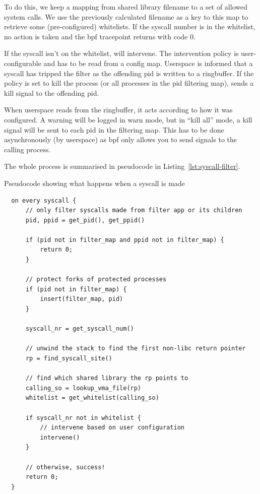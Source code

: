 To do this, we keep a mapping from shared library filename to a set of allowed
system calls. We use the previously calculated filename as a key to this map to
retrieve some (pre-configured) whitelists. If the syscall number is in the
whitelist, no action is taken and the \ac{bpf} tracepoint returns with code 0.

If the syscall isn't on the whitelist, \af will intervene. The intervention
policy is user-configurable and has to be read from a config map. Userspace is
informed that a syscall has tripped the filter as the offending \ac{pid} is
written to a ringbuffer. If the policy is set to kill the process (or all 
processes in the \ac{pid} filtering map), \af sends a kill signal to the 
offending \ac{pid}. 

When userspace reads  from the ringbuffer, it acts according to how it was
configured. A warning will be logged in warn mode, but in ``kill all'' mode, a
kill signal will be sent to each \ac{pid} in the filtering map. This has to be
done asynchronously (by userspace) as \ac{bpf} only allows you to send signals
to the calling process.

The whole process is summarised in pseudocode in
Listing~\ref{lst:syscall-filter}.


\begin{listing}[ht]
  \caption{Pseudocode showing what happens when a syscall is made}\label{lst:syscall-filter}
  \begin{verbatim}
  on every syscall {
      // only filter syscalls made from filter app or its children
      pid, ppid = get_pid(), get_ppid()

      if (pid not in filter_map and ppid not in filter_map) {
          return 0;
      }

      // protect forks of protected processes
      if (pid not in filter_map) {
          insert(filter_map, pid)
      }

      syscall_nr = get_syscall_num()

      // unwind the stack to find the first non-libc return pointer
      rp = find_syscall_site()

      // find which shared library the rp points to
      calling_so = lookup_vma_file(rp)
      whitelist = get_whitelist(calling_so)

      if syscall_nr not in whitelist {
          // intervene based on user configuration
          intervene()
      }

      // otherwise, success!
      return 0;
  }
  \end{verbatim}
\end{listing}


